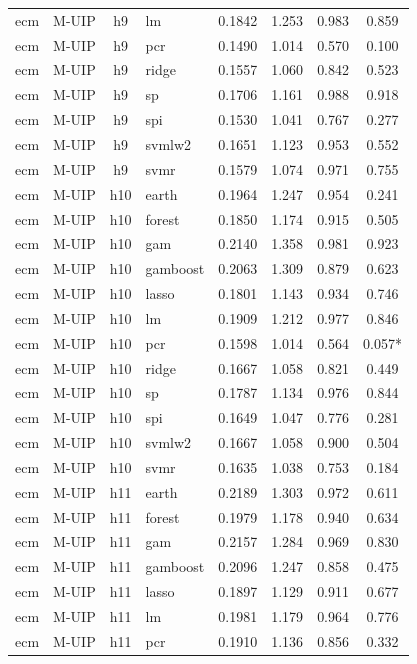 \begin{ThreePartTable}
\begin{longtable}[t]{llclcccc}
ecm & M-UIP & h9 & lm & 0.1842 & 1.253 & 0.983 & 0.859\\
ecm & M-UIP & h9 & pcr & 0.1490 & 1.014 & 0.570 & 0.100\\
ecm & M-UIP & h9 & ridge & 0.1557 & 1.060 & 0.842 & 0.523\\
ecm & M-UIP & h9 & sp & 0.1706 & 1.161 & 0.988 & 0.918\\
ecm & M-UIP & h9 & spi & 0.1530 & 1.041 & 0.767 & 0.277\\
ecm & M-UIP & h9 & svmlw2 & 0.1651 & 1.123 & 0.953 & 0.552\\
ecm & M-UIP & h9 & svmr & 0.1579 & 1.074 & 0.971 & 0.755\\
\addlinespace
ecm & M-UIP & h10 & earth & 0.1964 & 1.247 & 0.954 & 0.241\\
ecm & M-UIP & h10 & forest & 0.1850 & 1.174 & 0.915 & 0.505\\
ecm & M-UIP & h10 & gam & 0.2140 & 1.358 & 0.981 & 0.923\\
ecm & M-UIP & h10 & gamboost & 0.2063 & 1.309 & 0.879 & 0.623\\
ecm & M-UIP & h10 & lasso & 0.1801 & 1.143 & 0.934 & 0.746\\
ecm & M-UIP & h10 & lm & 0.1909 & 1.212 & 0.977 & 0.846\\
ecm & M-UIP & h10 & pcr & 0.1598 & 1.014 & 0.564 & 0.057*\\
ecm & M-UIP & h10 & ridge & 0.1667 & 1.058 & 0.821 & 0.449\\
ecm & M-UIP & h10 & sp & 0.1787 & 1.134 & 0.976 & 0.844\\
ecm & M-UIP & h10 & spi & 0.1649 & 1.047 & 0.776 & 0.281\\
ecm & M-UIP & h10 & svmlw2 & 0.1667 & 1.058 & 0.900 & 0.504\\
ecm & M-UIP & h10 & svmr & 0.1635 & 1.038 & 0.753 & 0.184\\
\addlinespace
ecm & M-UIP & h11 & earth & 0.2189 & 1.303 & 0.972 & 0.611\\
ecm & M-UIP & h11 & forest & 0.1979 & 1.178 & 0.940 & 0.634\\
ecm & M-UIP & h11 & gam & 0.2157 & 1.284 & 0.969 & 0.830\\
ecm & M-UIP & h11 & gamboost & 0.2096 & 1.247 & 0.858 & 0.475\\
ecm & M-UIP & h11 & lasso & 0.1897 & 1.129 & 0.911 & 0.677\\
ecm & M-UIP & h11 & lm & 0.1981 & 1.179 & 0.964 & 0.776\\
ecm & M-UIP & h11 & pcr & 0.1910 & 1.136 & 0.856 & 0.332\\

\end{longtable}
\end{ThreePartTable}
